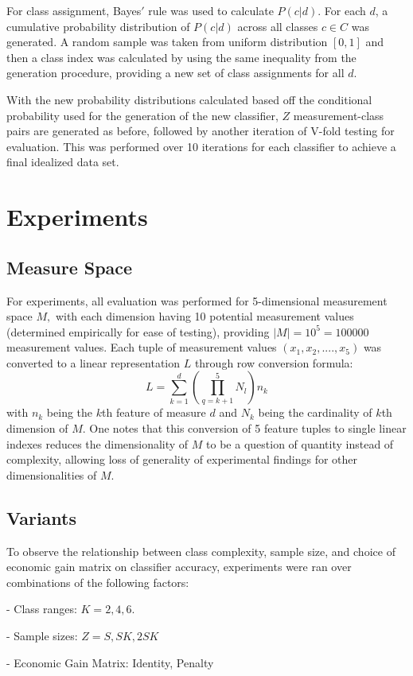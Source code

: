 \documentclass[10pt, conference]{IEEEtran}
\begin{document}
For class assignment, Bayes$'$ rule was used to calculate $P(c|d)$. For each $d$, a cumulative probability distribution of $P(c|d)$ across all classes $c\in C$ was generated. A random sample was taken from uniform distribution $[0,1]$ and then a class index was calculated by using the same inequality from the generation procedure, providing a new set of class assignments for all $d$. 

With the new probability distributions calculated based off the conditional probability used for the generation of the new classifier, $Z$ measurement-class pairs are generated as before, followed by another iteration of V-fold testing for evaluation. This was performed over 10 iterations for each classifier to achieve a final idealized data set.
\section{Experiments}
\subsection{Measure Space}
For experiments, all evaluation was performed for 5-dimensional measurement space $M,$ with each dimension having 10 potential measurement values (determined empirically for ease of testing), providing  $|M| = 10^5=100000$ measurement values. Each tuple of measurement values $(x_1,x_2,....,x_5)$ was converted to a linear representation $L$ through row conversion formula:
\begin{equation}
L = \sum_{k=1}^d (\prod_{q=k+ 1}^5 N_l ) n_k
\end{equation}
with $n_k$ being the $k$th feature of measure $d$ and $N_k$ being the cardinality of $k$th dimension of $M$. One notes that this conversion of 5 feature tuples to single linear indexes reduces the dimensionality of $M$ to be a question of quantity instead of complexity, allowing loss of generality of experimental findings for other dimensionalities of $M$.
\subsection{Variants}
To observe the relationship between class complexity, sample size, and choice of economic gain matrix on classifier accuracy, experiments were ran over combinations of the following factors:

- Class ranges: $K = 2,4,6.$

- Sample sizes: $Z= S, SK, 2SK$ 

- Economic Gain Matrix: Identity, Penalty
\end{document}

